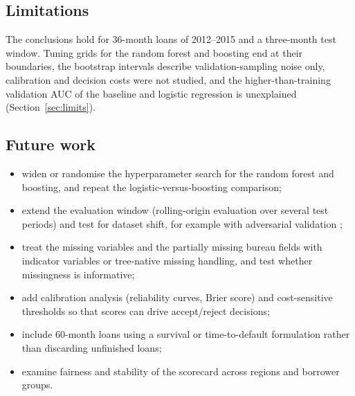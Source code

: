 \subsection*{Limitations}

The conclusions hold for 36-month loans of 2012--2015 and a three-month test window. Tuning grids for the random forest and boosting end at their boundaries, the bootstrap intervals describe validation-sampling noise only, calibration and decision costs were not studied, and the higher-than-training validation AUC of the baseline and logistic regression is unexplained (Section~\ref{sec:limits}).

\subsection*{Future work}

\begin{itemize}
    \item widen or randomise the hyperparameter search for the random forest and boosting, and repeat the logistic-versus-boosting comparison;
    \item extend the evaluation window (rolling-origin evaluation over several test periods) and test for dataset shift, for example with adversarial validation \cite{qian2021};
    \item treat the missing  variables and the partially missing bureau fields with indicator variables or tree-native missing handling, and test whether missingness is informative;
    \item add calibration analysis (reliability curves, Brier score) and cost-sensitive thresholds so that scores can drive accept/reject decisions;
    \item include 60-month loans using a survival or time-to-default formulation rather than discarding unfinished loans;
    \item examine fairness and stability of the scorecard across regions and borrower groups.
\end{itemize}
